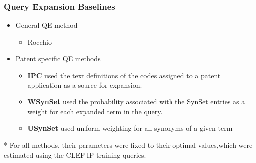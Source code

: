 \documentclass[xcolor=x11names,compress]{beamer}
\renewcommand{\(}{\begin{columns}}
\renewcommand{\)}{\end{columns}}
\newcommand{\<}[1]{\begin{column}{#1}}
\renewcommand{\>}{\end{column}}
\begin{document}
\begin{frame}
\frametitle{Query Expansion Baselines}

\begin{itemize}
\item {\color{DeepSkyBlue4}General QE method}
	\begin{itemize}
	\item Rocchio \cite{}
	\end{itemize}
\item {\color{DeepSkyBlue4}Patent specific QE methods}
	\begin{itemize}
	\item \textbf{IPC} \cite{Mahdabi2013} used the text definitions of the  codes assigned to a patent application as a source for expansion.
	\item \textbf{WSynSet} \cite{Magdy2011} used the probability associated with the SynSet entries as a weight for each expanded term in the query.
	\item \textbf{USynSet} \cite{Magdy2011} used uniform weighting for all synonyms of a given term 
	\end{itemize}
\end{itemize}
	


\begin{small}
* For all methods, their parameters were fixed to their optimal values,which were estimated using the CLEF-IP training queries.
\end{small}

\end{frame}
\end{document}
